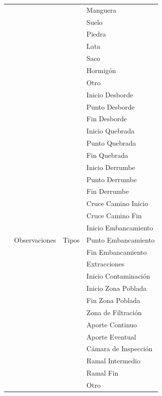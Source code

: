 \documentclass[]{article}
\begin{document}
\begin{longtable}{|p{3cm}|p{3.5cm}|p{3.5cm}|p{3.5cm}|}
    & & & Manguera\\    \cline{4-4}
    & & & Suelo\\    \cline{4-4}
    & & & Piedra\\    \cline{4-4}
    & & & Lata\\    \cline{4-4}
    & & & Saco\\    \cline{4-4}
    & & & Hormigón\\    \cline{4-4}
    & & & Otro\\  \cline{2-4}
    & \multirow {25}{3.5cm}{Observaciones} & \multirow {25}{3.5cm}{Tipos} & Inicio Desborde\\ \cline{4-4}
    & & & Punto Desborde\\ \cline{4-4}
    & & & Fin Desborde\\ \cline{4-4}
    & & & Inicio Quebrada\\ \cline{4-4}
    & & & Punto Quebrada\\ \cline{4-4}
    & & & Fin Quebrada\\ \cline{4-4}
    & & & Inicio Derrumbe\\ \cline{4-4}
    & & & Punto Derrumbe\\ \cline{4-4}
    & & & Fin Derrumbe\\ \cline{4-4}
    & & & Cruce Camino Inicio\\ \cline{4-4}
    & & & Cruce Camino Fin\\ \cline{4-4}
    & & & Inicio Embancamiento\\ \cline{4-4}
    & & & Punto Embancamiento\\ \cline{4-4}
    & & & Fin Embancamiento\\ \cline{4-4}
    & & & Extracciones\\ \cline{4-4}
    & & & Inicio Contaminación\\ \cline{4-4}
    & & & Inicio Zona Poblada\\ \cline{4-4}
    & & & Fin Zona Poblada\\ \cline{4-4}
    & & & Zona de Filtración\\ \cline{4-4}
    & & & Aporte Continuo\\ \cline{4-4}
    & & & Aporte Eventual\\ \cline{4-4}
    & & & Cámara de Inspección\\ \cline{4-4}
    & & & Ramal Intermedio\\ \cline{4-4}
    & & & Ramal Fin\\ \cline{4-4}
    & & & Otro\\ \cline{2-4}
    \end{longtable}
\end{document}
